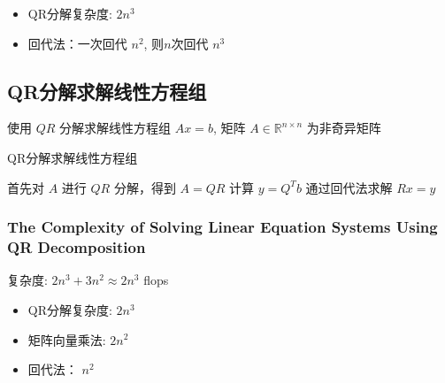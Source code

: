 \begin{itemize}
    \item QR分解复杂度: $ 2 n^{3} $
    \item 回代法：一次回代 $ n^{2} $, 则$n$次回代 $ n^{3} $
\end{itemize}


\subsection{QR分解求解线性方程组}

使用 $ Q R $ 分解求解线性方程组 $ A x=b $, 矩阵 $ A \in \mathbb{R}^{n \times n} $ 为非奇异矩阵

\begin{algorithm}[htbp]
    \caption{QR分解求解线性方程组}
    首先对 $ A $ 进行 $ Q R $ 分解，得到 $ A=Q R $\;
    计算 $ y=Q^{T} b $\;
    通过回代法求解 $ R x=y $\;
\end{algorithm}


\subsubsection{The Complexity of Solving Linear Equation Systems Using QR Decomposition}
\label{complexity:linear-equation-qr}

复杂度: $ 2 n^{3}+3 n^{2} \approx 2 n^{3} $ flops 

\begin{itemize}
    \item QR分解复杂度: $ 2 n^{3} $
    \item 矩阵向量乘法: $ 2 n^{2} $
    \item 回代法： $ n^{2} $
\end{itemize}
